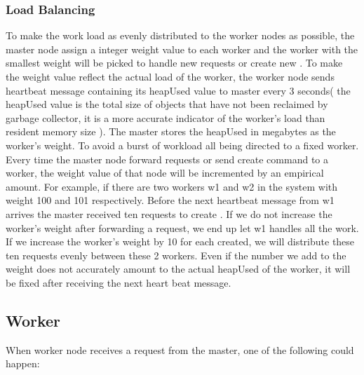 \subsubsection{Load Balancing}
\label{sec:lb}
To make the work load as evenly distributed to the worker nodes as possible,
the master node assign a integer weight value to each worker
and the worker with the smallest weight will be picked to handle new requests
or create new \appins{}.
To make the weight value reflect the actual load of the worker,
the worker node sends heartbeat message containing 
its heapUsed value to master every 3 seconds(
the heapUsed value is the total size of \js{} objects that have not been
reclaimed by garbage collector, 
it is a more accurate indicator of the worker's load than resident memory size
).
The master stores the heapUsed in megabytes as the worker's weight.
To avoid a burst of workload all being directed to a fixed worker.
Every time the master node forward requests or send create \appins{} command to a worker,
the weight value of that node will be incremented by an empirical amount.
For example, if there are two workers w1 and w2 in the system with weight
100 and 101 respectively.
Before the next heartbeat message from w1 arrives the master received ten requests to 
create \appins{}.
If we do not increase the worker's weight after forwarding a request,
we end up let w1 handles all the work.
If we increase the worker's weight by 10 for each \appins{} created,
we will distribute these ten requests evenly between these 2 workers.
Even if the number we add to the weight does not accurately amount to the actual 
heapUsed of the worker, it will be fixed after receiving the next heart beat message.

\subsection{Worker}
\label{sec:worker}
When worker node receives a request from the master,
one of the following could happen:

